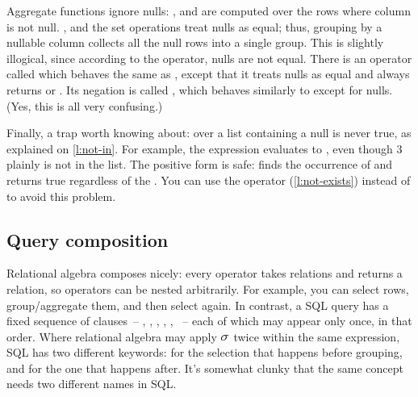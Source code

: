 Aggregate functions ignore nulls: ,  and  are computed over the rows where column  is not null.
,  and the set operations treat nulls as equal; thus, grouping by a nullable column collects all the null rows into a single group.
This is slightly illogical, since according to the \code{=} operator, nulls are not equal.
There is an operator called  which behaves the same as \code{=}, except that it treats nulls as equal and always returns  or .
Its negation is called , which behaves similarly to \code{<>} except for nulls.
(Yes, this is all very confusing.)

Finally, a trap worth knowing about:  over a list containing a null is never true, as explained on \autoref{l:not-in}.
For example, the expression  evaluates to , even though 3 plainly is not in the list.
The positive form is safe:  finds the occurrence of  and returns true regardless of the .
You can use the  operator (\autoref{l:not-exists}) instead of  to avoid this problem.


\subsection{Query composition}

Relational algebra composes nicely: every operator takes relations and returns a relation, so operators can be nested arbitrarily.
For example, you can select rows, group/aggregate them, and then select again.
In contrast, a SQL query has a fixed sequence of clauses~-- , , , , , ~-- each of which may appear only once, in that order.
Where relational algebra may apply $\raop{\sigma}$ twice within the same expression, SQL has two different keywords:  for the selection that happens before grouping, and  for the one that happens after.
It's somewhat clunky that the same concept needs two different names in SQL.

